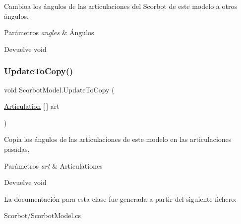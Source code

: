 Cambioa los ángulos de las articulaciones del Scorbot de este modelo a otros ángulos. 
\begin{DoxyParams}{Parámetros}
{\em angles} & Ángulos \\
\hline
\end{DoxyParams}
\begin{DoxyReturn}{Devuelve}
void 
\end{DoxyReturn}
\mbox{\label{class_scorbot_model_a78e73b1e1b2cda29a55529326ba2ca90}} 
\subsubsection{\texorpdfstring{UpdateToCopy()}{UpdateToCopy()}}
{\footnotesize\ttfamily void Scorbot\+Model.\+Update\+To\+Copy (\begin{DoxyParamCaption}\item[{\mbox{\hyperlink{class_articulation}{Articulation}} \mbox{[}$\,$\mbox{]}}]{art }\end{DoxyParamCaption})\hspace{0.3cm}{\ttfamily [inline]}}

Copia los ángulos de las articulaciones de este modelo en las articulaciones pasadas. 
\begin{DoxyParams}{Parámetros}
{\em art} & Articulationes \\
\hline
\end{DoxyParams}
\begin{DoxyReturn}{Devuelve}
void 
\end{DoxyReturn}


La documentación para esta clase fue generada a partir del siguiente fichero\+:\begin{DoxyCompactItemize}
\item 
Scorbot/Scorbot\+Model.\+cs\end{DoxyCompactItemize}
